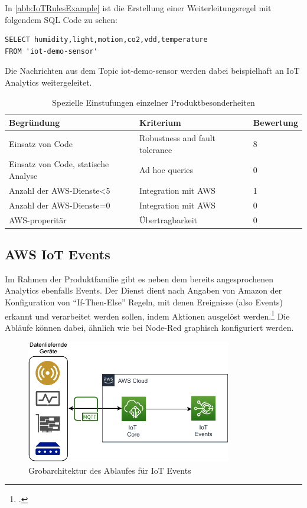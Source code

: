 In \autoref{abb:IoTRulesExample} ist die Erstellung einer Weiterleitungsregel mit folgendem SQL Code zu sehen:
\lstset{language=SQL} 
\begin{lstlisting}
SELECT humidity,light,motion,co2,vdd,temperature 
FROM 'iot-demo-sensor'
\end{lstlisting}
Die Nachrichten aus dem Topic iot-demo-sensor werden dabei beispielhaft an IoT Analytics weitergeleitet.

\begin{table}[H]
\centering
\begin{tabular}{|l|l|l|}
\hline
\rowcolor[HTML]{ECF4FF} 
Begründung & Kriterium & Bewertung \\ \hline
Einsatz von Code & Robustness and fault tolerance & 8 \\ \hline
Einsatz von Code, statische Analyse & Ad hoc queries & 0 \\ \hline
Anzahl der AWS-Dienste\textless{}5 & Integration mit AWS & 1 \\ \hline
Anzahl der AWS-Dienste=0 & Integration mit AWS & 0 \\ \hline
AWS-properitär & Übertragbarkeit & 0 \\ \hline
\end{tabular}
\caption{Spezielle Einstufungen einzelner Produktbesonderheiten}
\label{tab:einstufungen}
\end{table}



\subsection{AWS IoT Events}
Im Rahmen der \AWSIOT Produktfamilie gibt es neben dem bereits angesprochenen \AWSIOT Analytics ebenfalls \AWSIOT Events.  
Der Dienst dient nach Angaben von Amazon der Konfiguration von \enquote{If-Then-Else} Regeln, mit denen Ereignisse (also Events) erkannt und verarbeitet werden sollen, indem Aktionen ausgelöst werden.\footcite[Vgl.][]{AmazonWebServicesInc..o.J.b} Die Abläufe können dabei, ähnlich wie bei Node-Red graphisch konfiguriert werden. 
\begin{figure}[H]
\centering
\includegraphics[width=0.8\textwidth]{graphics/IoT-Events-general.pdf}
\caption{Grobarchitektur des Ablaufes für IoT Events}
\label{abb:GrobArchitekturIoTEvents}
\end{figure}

